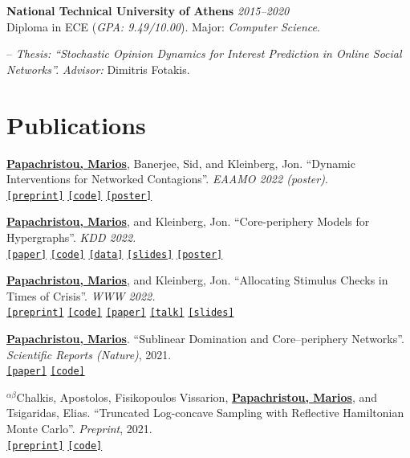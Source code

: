 \documentclass[margin]{res}
\newcommand{\field}[2]{\noindent \textbf{#1} \hfill #2 \\}
\newcommand{\alphabeticalorder}[0]{\ensuremath {^{\alpha \beta}}}
\newcommand{\specialurl}[2]{\href {#2} {\texttt{[#1]}}}
\newcommand{\preprint}[1]{\specialurl {preprint} {#1}}
\newcommand{\code}[1]{\specialurl {code} {#1}}
\newcommand{\data}[1]{\specialurl {data} {#1}}
\newcommand{\talk}[1]{\specialurl {talk} {#1}}
\newcommand{\slides}[1]{\specialurl {slides} {#1}}
\newcommand{\poster}[1]{\specialurl {poster} {#1}}
\newcommand{\paper}[1]{\specialurl {paper} {#1}}
\newcommand{\authorref}[1]{\underline {\textbf{#1}}}
\newcommand{\authorme}{\authorref{Papachristou, Marios}}
\begin{document}
\begin{resume}
\field{National Technical University of Athens}  {\emph{2015--2020}} 
Diploma in ECE (\emph{GPA: 9.49/10.00}). Major: \emph{Computer Science}.
\begin{compactitem}
\item[--] \emph{Thesis: ``Stochastic Opinion Dynamics for Interest Prediction in Online Social Networks''.} \emph{Advisor:} Dimitris Fotakis.

\end{compactitem} 

\section{Publications}

\begin{compactenum}
   \item \authorme, Banerjee, Sid, and Kleinberg, Jon. ``Dynamic Interventions for Networked Contagions''. \emph{EAAMO 2022 (poster)}. \\
		\preprint{https://arxiv.org/abs/2205.13394} \code{https://github.com/papachristoumarios/dynamic-clearing} \poster{https://drive.google.com/file/d/1l0TCsoZNo3NoOOHsPSh1ofctXD4ivFir/view?usp=sharing}
   \item \authorme, and Kleinberg, Jon. ``Core-periphery Models for Hypergraphs''. \emph{KDD 2022.} \\
   \paper{https://arxiv.org/abs/2206.00783} \code{https://doi.org/10.5281/zenodo.5965849} \data{https://doi.org/10.5281/zenodo.5943043} \slides{https://drive.google.com/file/d/1k9pjPaeDtg7jhUivjlEmyunimcUb-DxL/view?usp=sharing} \poster{https://drive.google.com/file/d/1RJ3C7KKhTemfj5OBAiEXUHMVp-TJhTDs/view?usp=sharing}
   \item  \authorme, and Kleinberg, Jon. ``Allocating Stimulus Checks in Times of Crisis''. \emph{WWW 2022.} \\\preprint{https://arxiv.org/abs/2106.07560} \code{https://github.com/papachristoumarios/financial-contagion} \paper{https://doi.org/10.1145/3485447.3512047} \talk{https://youtu.be/WUmPBztK8Mo} \slides{https://drive.google.com/file/d/1v4v4jPOTzFtP8a5dhAFLoIjZSRDxAjBz/view?usp=sharing}    
   \item \authorme. ``Sublinear Domination and Core--periphery Networks''. \emph{Scientific Reports (Nature)}, 2021. \\ \paper{http://www.nature.com/articles/s41598-021-94105-8} \code{https://bit.ly/3wKNGI0} 
    \item \alphabeticalorder Chalkis, Apostolos, Fisikopoulos Vissarion, \authorme, and Tsigaridas, Elias. ``Truncated Log-concave Sampling with Reflective Hamiltonian Monte Carlo''.  \emph{Preprint}, 2021. \\ \preprint{https://arxiv.org/abs/2102.13068} \code{https://github.com/GeomScale/volume_approximation}

\end{compactenum}
\end{resume}
\end{document}
